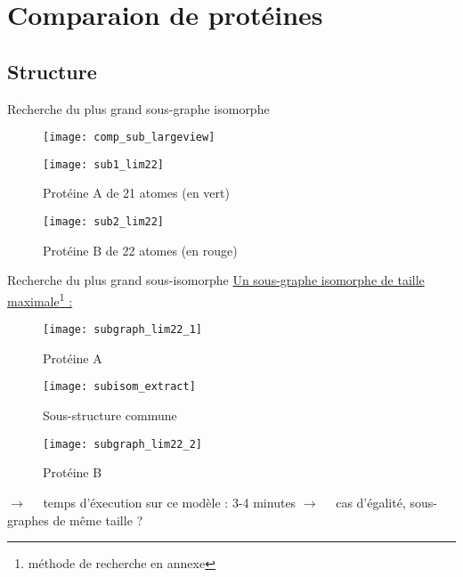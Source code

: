\section{Comparaion de protéines}

\subsection{Structure}
\begin{frame}{Recherche du plus grand sous-graphe isomorphe}
    \scriptsize
    \begin{figure}[!htb]
    \texttt{[image: comp\_sub\_largeview]}
    \end{figure}
    \begin{multicols}{2}
        \begin{figure}[!htb]
            \centering
            \texttt{[image: sub1\_lim22]}
            \caption{\label{fig: sub1}Protéine A de 21 atomes (en vert)}
        \end{figure}
        \begin{figure}[!htb]
            \centering
            \texttt{[image: sub2\_lim22]}
            \caption{\label{fig: sub2}Protéine B de 22 atomes (en rouge)}
        \end{figure}
    \end{multicols}
\end{frame}

\begin{frame}{Recherche du plus grand sous-isomorphe}
    \underline{Un sous-graphe isomorphe de taille maximale\footnote{méthode de recherche en annexe} :}
    \begin{multicols}{3}
        \begin{figure}[!htb]
            \centering
            \texttt{[image: subgraph\_lim22\_1]}
            \caption{\label{fig: protA} Protéine A}
        \end{figure}
        \begin{figure}[!htb]
            \centering
            \texttt{[image: subisom\_extract]}
            \caption{\label{fig: extract} Sous-structure commune} 
        \end{figure}
        \begin{figure}[!htb]
            \centering
            \texttt{[image: subgraph\_lim22\_2]}
            \caption{\label{fig: protB} Protéine B}
        \end{figure}
    \end{multicols} 
    $\rightarrow \quad$ temps d'éxecution sur ce modèle : 3-4 minutes \newline
    $\rightarrow \quad$ cas d'égalité, sous-graphes de même taille ?
\end{frame}

